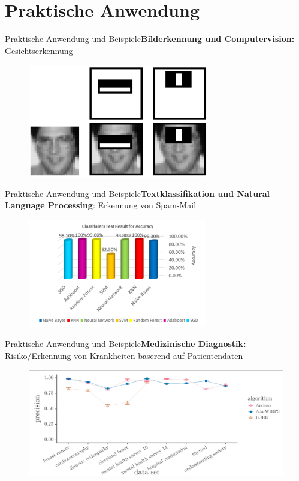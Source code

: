 \documentclass[hyperref={bookmarks=false},11pt,dvipsnames]{beamer}
\begin{document}
\section{Praktische Anwendung}
\begin{frame}{Praktische Anwendung und Beispiele}{\textbf{Bilderkennung und Computervision:} Gesichtserkennung}
	\begin{figure}
		\centering
		\includegraphics[width=0.7\textwidth]{../Ausarbeitung/figures/CV_Example.png}
	\end{figure}
\end{frame}
\begin{frame}{Praktische Anwendung und Beispiele}{\textbf{Textklassifikation und Natural Language Processing}: Erkennung von Spam-Mail}
	\begin{figure}
		\centering
		\includegraphics[width=0.7\textwidth]{../Ausarbeitung/figures/spam.png}
	\end{figure}
\end{frame}
\begin{frame}{Praktische Anwendung und Beispiele}{\textbf{Medizinische Diagnostik:} Risiko/Erkennung von Krankheiten baserend auf Patientendaten}
	\begin{figure}
		\centering
		\includegraphics[width=\textwidth]{../Ausarbeitung/figures/ada-whips.png}
	\end{figure}
\end{frame}
\end{document}
